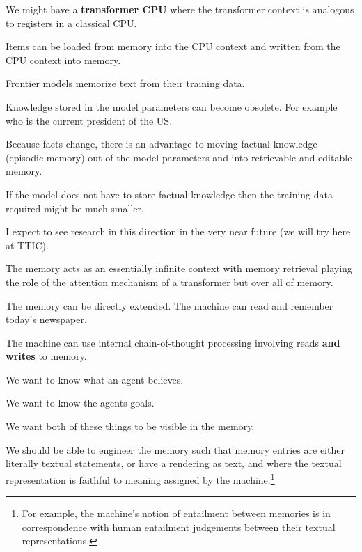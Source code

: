 {\vfill
We might have a {\bf transformer CPU} where the transformer context is analogous to registers in a classical CPU.

\vfill
Items can be loaded from memory into the CPU context and written from the CPU context into memory.


Frontier models memorize text from their training data.

\vfill
Knowledge stored in the model parameters can become obsolete.  For example who is the current president of the US.

\vfill
Because facts change, there is an advantage to moving factual knowledge (episodic memory) out of the model parameters
and into retrievable and editable memory.

\vfill
If the model does not have to store factual knowledge then the training data required might be much smaller.

\vfill
I expect to see research in this direction in the very near future (we will try here at TTIC).


The memory acts as an essentially infinite context with memory retrieval playing the role of the attention mechanism of a transformer
but over all of memory.

\vfill
The memory can be directly extended. The machine can read and remember today's newspaper.

\vfill
The machine can use internal chain-of-thought processing involving reads {\bf and writes} to memory.



We want to know what an agent believes.

\vfill
We want to know the agents goals.

\vfill
We want both of these things to be visible in the memory.


\vfill
We should be able to engineer the memory such that memory entries are either literally textual statements,
or have a rendering as text, and where the textual representation is faithful to meaning assigned by the machine.\footnote{\Large For example, the machine's notion of entailment
between memories is in correspondence with human entailment judgements between their textual representations.}

}
